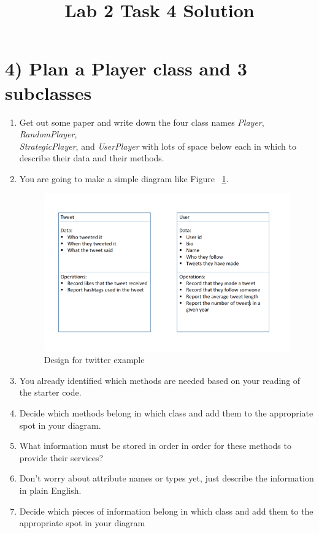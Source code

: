 \documentclass[12pt]{article}
\begin{document}
\title{Lab 2 Task 4 Solution}
\date{}
\maketitle


\section*{4) Plan a Player class and 3 subclasses}
\begin{enumerate}[1.]
    \item Get out some paper and write down the four class names \textit{Player},
    \textit{RandomPlayer},\\ \textit{StrategicPlayer}, and \textit{UserPlayer} with lots
    of space below each in which to describe their data and their methods.
    \item You are going to make a simple diagram like Figure ~\ref{fig:uml}.

    \begin{figure}
        \begin{center}
        \includegraphics[width=0.8\linewidth]{../../images/lab_3/uml.png}
        \end{center}
        \caption{Design for twitter example}
        \label{fig:uml}
    \end{figure}

    \item You already identified which methods are needed based on your reading of the
    starter code.
    \item Decide which methods belong in which class and add them to the appropriate
    spot in your diagram.
    \item What information must be stored in order in order for these methods to provide
    their services?
    \item Don’t worry about attribute names or types yet, just describe the information
    in plain English.
    \item Decide which pieces of information belong in which class and add them to the
    appropriate spot in your diagram
\end{enumerate}
\end{document}
